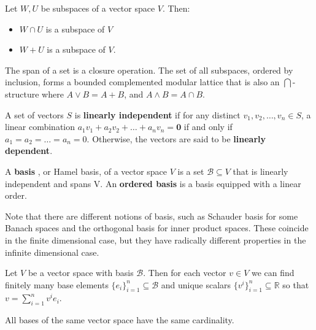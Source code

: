 \documentclass{bareminimum}
\begin{document}
	\begin{prop}
		Let $W,U$ be subspaces of a vector space $V$. Then:
		\begin{itemize}
			\item $W \cap U$ is a subspace of $V$
			\item $W + U$ is a subspace of $V$.
		\end{itemize}
	\end{prop}
	
	\begin{prop}
		The span of a set is a closure operation. The set of all subspaces, ordered by inclusion, forms a bounded complemented modular lattice that is also an $\bigcap$-structure where $A \vee B= A + B$, and $A \wedge B = A \cap B$.
	\end{prop}
	
	\begin{defn}
		A set of vectors $S$  is \textbf{linearly independent} if for any distinct $v_1, v_2, \ldots, v_n \in S$, a linear combination $a_1 v_1 + a_2 v_2 + \ldots + a_n v_n = \mathbf{0}$ if and only if $a_1 = a_2 = \ldots = a_n = 0$. Otherwise, the vectors are said to be \textbf{linearly dependent}.
	\end{defn}
	
	\begin{defn}[Basis]
		A \textbf{basis} , or Hamel basis, of a vector space $V$ is a set $\mathcal{B} \subseteq V$ that is linearly independent and spans V. An \textbf{ordered basis} is a basis equipped with a linear order.
	\end{defn}
	
	\begin{remark}
		Note that there are different notions of basis, such as Schauder basis for some Banach spaces and the orthogonal basis for inner product spaces. These coincide in the finite dimensional case, but they have radically different properties in the infinite dimensional case.
	\end{remark}
	
	\begin{prop}
		Let $V$ be a vector space with basis $\mathcal{B}$. Then for each vector $v \in V$ we can find finitely many base elements $\{e_i\}_{i=1}^n \subseteq \mathcal{B}$ and unique scalars $\{v^i\}_{i=1}^n \subseteq \mathbb{R}$ so that $v = \sum_{i=1}^n v^i e_i$.
	\end{prop}
	\begin{prop}
		All bases of the same vector space have the same cardinality.
	\end{prop}
	
\end{document}
